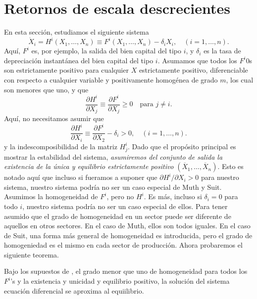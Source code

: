 \section{Retornos de escala descrecientes}
En esta sección, estudiamos el siguiente sistema
\begin{equation}
\dot{X}_{i}=H^{i}\left(X_{1},\ldots,X_{n}\right)\equiv F^{i}\left(X_{1},\ldots,X_{n}\right)-\delta_{i}X_{i},\quad\left(i=1,\ldots,n\right).
\end{equation}
Aquí, $F^{i}$ es, por ejemplo, la salida %
del bien capital del tipo $i$, y $\delta_{i}$ es la tasa de depreciación instantánea del bien capital del tipo $i$. Asumamos que todos los $F^{i}$0s son estrictamente positivo para cualquier $X$ estrictamente positivo, diferenciable con respecto a cualquier variable y positivamente homogénea de grado $m$, los cual son menores que uno, y que
\begin{equation}
\frac{\partial H^{i}}{\partial X_{j}}\equiv\frac{\partial F^{i}}{\partial X_{j}}\geq0\quad\text{para }j\neq i.
\end{equation}
Aquí, no necesitamos asumir que \[ \frac{\partial H^{i}}{\partial X_{i}}\equiv\frac{\partial F^{i}}{\partial X_{2}}-\delta_{i}>0,\quad\left(i=1,\ldots,n\right). \] y la indescomposibilidad de la matriz $H^{i}_{j}$. Dado que el propósito principal es mostrar la estabilidad del sistema, \emph{asumiremos del conjunto de salida la existencia de la única y equilibrio estrictamente positivo} $\left(\overline{X}_{1},\ldots,\overline{X}_{n}\right)$. Esto es notado aquí que incluso si fueramos a suponer que $\partial H^{i}/\partial X_{i}>0$ para nuestro sistema, nuestro sistema podría no ser un caso especial de Muth y Suit. Asumimos la homogeneidad de $F^{i}$, pero no $H^{i}$. Es más, incluso si $\delta_{i}=0$ para todo $i$, nuestro sistema podría no ser un caso especial de ellos. Para tener asumido que el grado de homogeneidad en un sector puede ser diferente de aquellos en otros sectores. En el caso de Muth, ellos son todos iguales. En el caso de Suit, una  forma más general de homogeneidad es introducida, pero el grado de homogeniedad es el mismo en cada sector de producción. Ahora probaremos el siguiente teorema.
\begin{theorem}
	Bajo los supuestos de %
	, el grado menor que uno de homogeneidad para todos los $F^{i}$'s y la existencia y unicidad y equilibrio positivo, la solución del sistema ecuación diferencial %
	se aproxima al equiilibrio.
\end{theorem}
